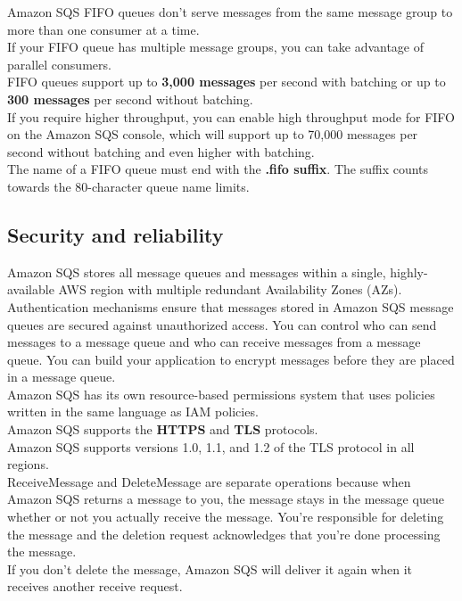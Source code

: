 \documentclass[12pt, letterpaper, twoside]{article}
\begin{document}
Amazon SQS FIFO queues don't serve messages from the same message group to more than one consumer at a time.\\ 
If your FIFO queue has multiple message groups, you can take advantage of parallel consumers.\\

FIFO queues support up to \textbf{3,000 messages} per second with batching or up to \textbf{300 messages} per second
without batching.\\
If you require higher throughput, you can enable high throughput mode for FIFO on the Amazon SQS console, 
which will support up to 70,000 messages per second without batching and even higher with batching.\\

The name of a FIFO queue must end with the \textbf{.fifo suffix}. The suffix counts towards the 80-character queue 
name limits.\\

\subsection{Security and reliability}
Amazon SQS stores all message queues and messages within a single, highly-available AWS region with multiple redundant 
Availability Zones (AZs).\\

Authentication mechanisms ensure that messages stored in Amazon SQS message queues are secured against unauthorized access.
You can control who can send messages to a message queue and who can receive messages from a message queue.
You can build your application to encrypt messages before they are placed in a message queue.\\
Amazon SQS has its own resource-based permissions system that uses policies written in the same language as IAM policies.\\
Amazon SQS supports the \textbf{HTTPS} and \textbf{TLS} protocols.\\
Amazon SQS supports versions 1.0, 1.1, and 1.2 of the TLS protocol in all regions.\\

ReceiveMessage and DeleteMessage are separate operations because when Amazon SQS returns a message to you, the message stays 
in the message queue whether or not you actually receive the message. 
You're responsible for deleting the message and the deletion request acknowledges that you’re done processing the message.\\
If you don’t delete the message, Amazon SQS will deliver it again when it receives another receive request.\\
\end{document}
